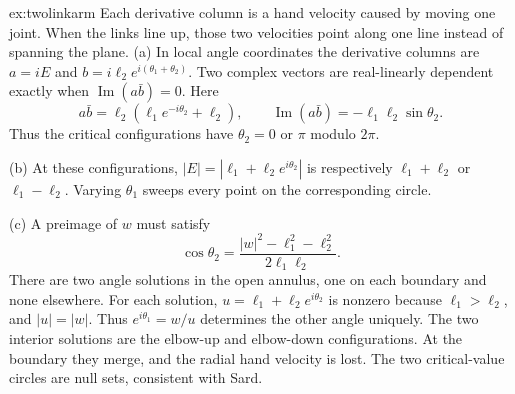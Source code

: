 \begin{solution}{ex:twolinkarm}
\idea Each derivative column is a hand velocity caused by moving one joint. When the links line up, those two velocities point along one line instead of spanning the plane.
\writeup (a) In local angle coordinates the derivative columns are $a=iE$ and $b=i\ell_2e^{i(\theta_1+\theta_2)}$. Two complex vectors are real-linearly dependent exactly when $\operatorname{Im}(a\bar b)=0$. Here
\[
a\bar b=\ell_2(\ell_1e^{-i\theta_2}+\ell_2),\qquad
\operatorname{Im}(a\bar b)=-\ell_1\ell_2\sin\theta_2.
\]
Thus the critical configurations have $\theta_2=0$ or $\pi$ modulo $2\pi$.

(b) At these configurations, $|E|=|\ell_1+\ell_2e^{i\theta_2}|$ is respectively $\ell_1+\ell_2$ or $\ell_1-\ell_2$. Varying $\theta_1$ sweeps every point on the corresponding circle.

(c) A preimage of $w$ must satisfy
\[
\cos\theta_2=\frac{|w|^2-\ell_1^2-\ell_2^2}{2\ell_1\ell_2}.
\]
There are two angle solutions in the open annulus, one on each boundary and none elsewhere. For each solution, $u=\ell_1+\ell_2e^{i\theta_2}$ is nonzero because $\ell_1>\ell_2$, and $|u|=|w|$. Thus $e^{i\theta_1}=w/u$ determines the other angle uniquely. The two interior solutions are the elbow-up and elbow-down configurations. At the boundary they merge, and the radial hand velocity is lost. The two critical-value circles are null sets, consistent with Sard.
\end{solution}

